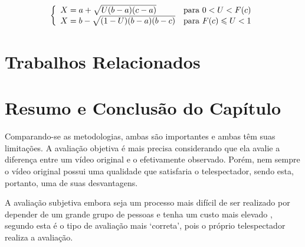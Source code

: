 \[\left\{\begin{array}{l l}
X = a +\sqrt{U(b-a)(c-a)} & \mbox{para } 0 < U < F(c)\\ 
X = b - \sqrt{(1-U)(b-a)(b-c)} & \mbox{para } F(c) \leqslant U < 1
\end{array}\right.\]

\section{Trabalhos Relacionados}



\section{Resumo e Conclusão do Capítulo}

Comparando-se as metodologias, ambas são importantes e ambas têm suas limitações. A avaliação objetiva é mais precisa considerando que ela avalie a diferença entre um vídeo original e o efetivamente observado. Porém, nem sempre o vídeo original possui uma qualidade que satisfaria o telespectador, sendo esta, portanto, uma de suas desvantagens.

A avaliação subjetiva embora seja um processo mais difícil de ser realizado por depender de um grande grupo de pessoas e tenha um custo mais elevado \cite{albini}, segundo \cite{wangbovik2004} esta é o tipo de avaliação mais ‘correta’, pois o próprio telespectador realiza a avaliação.
